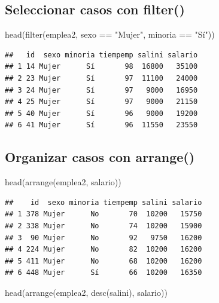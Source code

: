 \documentclass[
]{book}
\newenvironment{Shaded}{\begin{snugshade}}{\end{snugshade}}
\newcommand{\FunctionTok}[1]{\textcolor[rgb]{0.00,0.00,0.00}{#1}}
\newcommand{\NormalTok}[1]{#1}
\newcommand{\SpecialCharTok}[1]{\textcolor[rgb]{0.00,0.00,0.00}{#1}}
\newcommand{\StringTok}[1]{\textcolor[rgb]{0.31,0.60,0.02}{#1}}
\theoremstyle{break}
\begin{document}
\hypertarget{seleccionar-casos-con-filter}{%
\subsection{\texorpdfstring{Seleccionar casos con \textbf{filter()}}{Seleccionar casos con filter()}}\label{seleccionar-casos-con-filter}}

\begin{Shaded}
\begin{Highlighting}[]
\FunctionTok{head}\NormalTok{(}\FunctionTok{filter}\NormalTok{(emplea2, sexo }\SpecialCharTok{==} \StringTok{"Mujer"}\NormalTok{, minoria }\SpecialCharTok{==} \StringTok{"Sí"}\NormalTok{))}
\end{Highlighting}
\end{Shaded}

\begin{verbatim}
##   id  sexo minoria tiempemp salini salario
## 1 14 Mujer      Sí       98  16800   35100
## 2 23 Mujer      Sí       97  11100   24000
## 3 24 Mujer      Sí       97   9000   16950
## 4 25 Mujer      Sí       97   9000   21150
## 5 40 Mujer      Sí       96   9000   19200
## 6 41 Mujer      Sí       96  11550   23550
\end{verbatim}

\hypertarget{organizar-casos-con-arrange}{%
\subsection{\texorpdfstring{Organizar casos con \textbf{arrange()}}{Organizar casos con arrange()}}\label{organizar-casos-con-arrange}}

\begin{Shaded}
\begin{Highlighting}[]
\FunctionTok{head}\NormalTok{(}\FunctionTok{arrange}\NormalTok{(emplea2, salario))}
\end{Highlighting}
\end{Shaded}

\begin{verbatim}
##    id  sexo minoria tiempemp salini salario
## 1 378 Mujer      No       70  10200   15750
## 2 338 Mujer      No       74  10200   15900
## 3  90 Mujer      No       92   9750   16200
## 4 224 Mujer      No       82  10200   16200
## 5 411 Mujer      No       68  10200   16200
## 6 448 Mujer      Sí       66  10200   16350
\end{verbatim}

\begin{Shaded}
\begin{Highlighting}[]
\FunctionTok{head}\NormalTok{(}\FunctionTok{arrange}\NormalTok{(emplea2, }\FunctionTok{desc}\NormalTok{(salini), salario))}
\end{Highlighting}
\end{Shaded}
\end{document}
